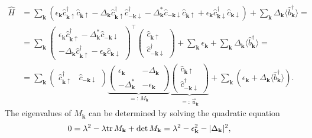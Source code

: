 \documentclass[english, parskip=full]{scrartcl}
\newcommand{\kla}{}
\newcommand{\tecxt}{}
\begin{document}
\begin{align}
\hat{H} &= \sum_{\mathbf{k}} \kla\left( \epsilon_{\mathbf{k}} \hat{c}_{\mathbf{k}\uparrow}^\dagger \hat{c}_{\mathbf{k}\uparrow} - \Delta_{\mathbf{k}} \hat{c}_{\mathbf{k}\uparrow}^\dagger \hat{c}_{-\mathbf{k}\downarrow}^\dagger - \Delta_{\mathbf{k}}^\ast \hat{c}_{-\mathbf{k}\downarrow} \hat{c}_{\mathbf{k}\uparrow} + \epsilon_{\mathbf{k}} \hat{c}_{\mathbf{k}\downarrow}^\dagger \hat{c}_{\mathbf{k}\downarrow}  \right)  + \sum_{\textbf{k}} \Delta_\textbf{k} \langle \hat{b}_{\mathbf{k}}^\dagger \rangle = \\
&= \sum_{\mathbf{k}} \begin{pmatrix}
\epsilon_{\mathbf{k}} \hat{c}_{\mathbf{k}\uparrow}^\dagger - \Delta_{\mathbf{k}}^\ast \hat{c}_{-\mathbf{k}\downarrow} \\ -\Delta_{\mathbf{k}}\hat{c}_{\mathbf{k}\uparrow}^\dagger - \epsilon_{\mathbf{k}} \hat{c}_{\mathbf{k}\downarrow}
\end{pmatrix}^\top \begin{pmatrix}
\hat{c}_{\mathbf{k}\uparrow} \\ \hat{c}_{-\mathbf{k}\downarrow}^\dagger
\end{pmatrix} + \sum_{\mathbf{k}}\epsilon_{\mathbf{k}} + \sum_{\textbf{k}} \Delta_\textbf{k} \langle \hat{b}_{\mathbf{k}}^\dagger \rangle = \\
&= \sum_{\mathbf{k}} \begin{pmatrix}
\hat{c}_{\mathbf{k}\uparrow}^\dagger & \hat{c}_{-\mathbf{k}\downarrow}
\end{pmatrix} \underbrace{\begin{pmatrix}
\epsilon_{\mathbf{k}} & -\Delta_{\mathbf{k}} \\ -\Delta_{\mathbf{k}}^\ast & -\epsilon_{\mathbf{k}}
\end{pmatrix}}_{=:\,M_{\mathbf{k}}} \underbrace{\begin{pmatrix}
\hat{c}_{\mathbf{k}\uparrow} \\ \hat{c}_{-\mathbf{k}\downarrow}^\dagger
\end{pmatrix}}_{=:\,\vec{u}_{\mathbf{k}}}  + \sum_{\textbf{k}}\kla\left(  \epsilon_\textbf{k} + \Delta_\textbf{k} \langle \hat{b}_{\mathbf{k}}^\dagger \rangle \right).
\end{align}
The eigenvalues of $M_{\mathbf{k}}$ can be determined by solving the quadratic equation
\begin{align}
0 &= \lambda^2 - \lambda \tecxt\text{tr\,}M_{\mathbf{k}} + \det M_{\mathbf{k}} = \lambda^2 - \epsilon_{\mathbf{k}}^2 - |\Delta_{\mathbf{k}}|^2,
\end{align}
\end{document}

